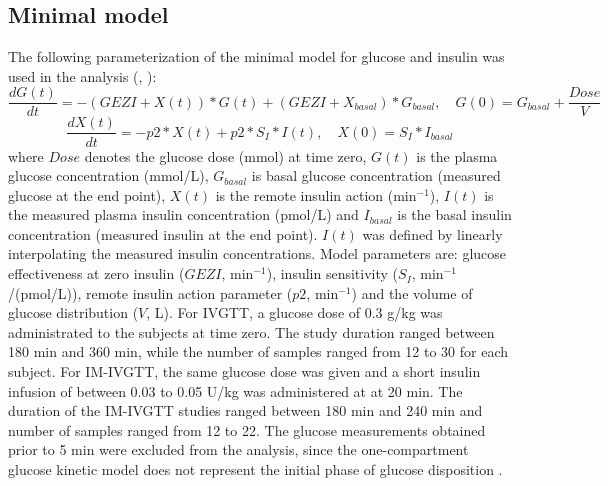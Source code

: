 \documentclass[utf8]{frontiersSCNS} %
\begin{document}
\subsection{Minimal model}
The following parameterization of the minimal model for glucose and insulin was used in the analysis (\citet{Bergman1979}, \citet{Araujo-vilar1998}):
\begin{equation}
\frac{dG(t)}{dt} =-(GEZI+X(t))*G(t)+(GEZI+X_{basal})*G_{basal}, \quad G(0) =G_{basal}+\frac{Dose}{V}\label{eq:01}
\end{equation}
\begin{equation}
\frac{dX(t)}{dt} =-p2*X(t)+p2*S_I*I(t), \quad X(0) =S_I*I_{basal}\label{eq:02}
\end{equation}
where $Dose$ denotes the glucose dose (mmol) at time zero, $G(t)$ is the plasma glucose concentration (mmol/L), $G_{basal}$ is basal glucose concentration (measured glucose at the end point), $X(t)$ is the remote insulin action (min$^{-1}$), $I(t)$ is the measured plasma insulin concentration (pmol/L) and $I_{basal}$ is the basal insulin concentration (measured insulin at the end point). $I(t)$ was defined by linearly interpolating the measured insulin concentrations. Model parameters are: glucose effectiveness at zero insulin ($GEZI$, min$^{-1}$), insulin sensitivity ($S_I$, min$^{-1}$/(pmol/L)), remote insulin action parameter ($p2$, min$^{-1}$) and the volume of glucose distribution ($V$, L). For IVGTT, a glucose dose of 0.3 g/kg was administrated to the subjects at time zero. The study duration ranged between 180 min and 360 min, while the number of samples ranged from 12 to 30 for each subject. For IM-IVGTT, the same glucose dose was given and a short insulin infusion of between 0.03 to 0.05 U/kg  was administered at at 20 min. The duration of the IM-IVGTT studies ranged between 180 min and 240 min and number of samples ranged from 12 to 22. The glucose measurements obtained prior to 5 min were excluded from the analysis, since the one-compartment glucose kinetic model does not represent the initial phase of glucose disposition  \citep{Vicini1999}.

\vskip 0.5cm
\end{document}

